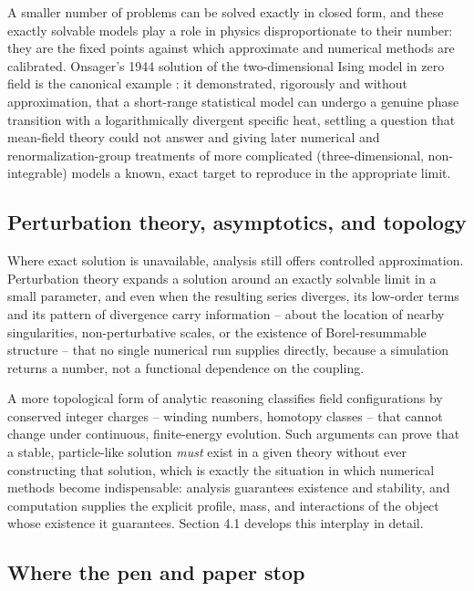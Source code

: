 \documentclass[11pt]{article}
\begin{document}
A smaller number of problems can be solved exactly in closed form, and these exactly solvable models play a role in physics disproportionate to their number: they are the fixed points against which approximate and numerical methods are calibrated. Onsager's 1944 solution of the two-dimensional Ising model in zero field is the canonical example \cite{Onsager1944}: it demonstrated, rigorously and without approximation, that a short-range statistical model can undergo a genuine phase transition with a logarithmically divergent specific heat, settling a question that mean-field theory could not answer and giving later numerical and renormalization-group treatments of more complicated (three-dimensional, non-integrable) models a known, exact target to reproduce in the appropriate limit.

\subsection{Perturbation theory, asymptotics, and topology}

Where exact solution is unavailable, analysis still offers controlled approximation. Perturbation theory expands a solution around an exactly solvable limit in a small parameter, and even when the resulting series diverges, its low-order terms and its pattern of divergence carry information -- about the location of nearby singularities, non-perturbative scales, or the existence of Borel-resummable structure -- that no single numerical run supplies directly, because a simulation returns a number, not a functional dependence on the coupling.

A more topological form of analytic reasoning classifies field configurations by conserved integer charges -- winding numbers, homotopy classes -- that cannot change under continuous, finite-energy evolution. Such arguments can prove that a stable, particle-like solution \emph{must} exist in a given theory without ever constructing that solution, which is exactly the situation in which numerical methods become indispensable: analysis guarantees existence and stability, and computation supplies the explicit profile, mass, and interactions of the object whose existence it guarantees. Section 4.1 develops this interplay in detail.

\subsection{Where the pen and paper stop}
\end{document}
